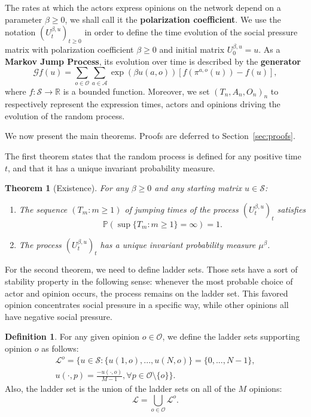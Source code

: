 \documentclass[11pt]{article}
\newtheorem{theorem}{Theorem}
\theoremstyle{definition}
\newtheorem{definition}{Definition}
\newcommand{\st}{\mathcal{S}}
\def\R{{\mathbb R}}
\begin{document}
The rates at which the actors express opinions on the network depend on a parameter $\beta\geq0$, we shall call it the \textbf{polarization coefficient}. We use the notation $(U_t^{\beta,u})_{t\geq0}$ in order to define the time evolution of the social pressure matrix with polarization coefficient $\beta\geq0$ and initial matrix $U_0^{\beta,u}=u$. As a \textbf{Markov Jump Process}, its evolution over time is described by the \textbf{generator}
\begin{equation} \label{generator:withoutbias}
\mathcal{G}f(u)=\sum_{o\in\mathcal{O}}\sum_{a\in\mathcal{A}}\exp(\beta u(a,o))[f(\pi^{a,o}(u))-f(u)],    
\end{equation}
where $f:\st \to \R$ is a bounded function. Moreover, we set $(T_n,A_n,O_n)_n$ to respectively represent the expression times, actors and opinions driving the evolution of the random process.

We now present the main theorems. Proofs are deferred to Section~\ref{sec:proofs}.

The first theorem states that the random process is defined for any positive time $t$, and that it has a unique invariant probability measure.

\begin{theorem}[Existence]\label{Theorem 1}
    For any $\beta\geq 0$ and any starting matrix $u\in\mathcal{S}$:
    \begin{enumerate}
        \item The sequence $(T_m:m\geq 1)$ of jumping times of the process $(U^{\beta, u}_t)_t$ satisfies
    \[\mathbb{P}(\sup\{T_m:m\geq 1\} = \infty)=1. \]
        \item The process $(U^{\beta,u}_t)_t$ has a unique invariant probability measure $\mu^\beta$.
    \end{enumerate}
\end{theorem}


For the second theorem, we need to define ladder sets. Those sets have a sort of stability property in the following sense: whenever the most probable choice of actor and opinion occurs, the process remains on the ladder set. This favored opinion concentrates social pressure in a specific way, while other opinions all have negative social pressure.


\begin{definition}\label{newL} 
    For any given opinion $o\in\mathcal{O}$, we define the ladder sets supporting opinion $o$ as follows:
\begin{multline*}
\mathcal{L}^o=\{u\in\st: \{u(1,o),...,u(N,o) \} = \{0,...,N-1 \}, \\ u(\cdot,p)=\frac{-u(\cdot,o)}{M-1}, \forall p \in\mathcal{O}\setminus \{o\}\}.
\end{multline*}
    Also, the ladder set is the union of the ladder sets on all of the $M$ opinions:
    \[\mathcal{L}=\bigcup_{o\in\mathcal{O}}\mathcal{L}^o.\]
\end{definition}
\end{document}
